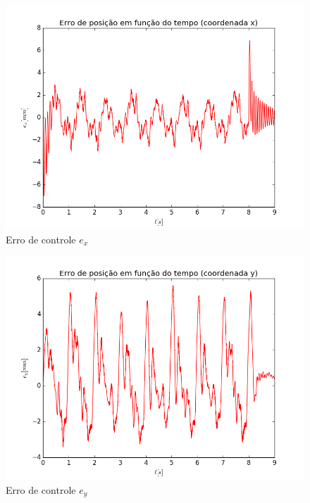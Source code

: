 \documentclass[]{politex}
\begin{document}
\begin{multicols}{2}
\begin{figure}[H]
	\centering
	\includegraphics[scale=0.39]{../../../Experimental/Aquisicoes/PIDSMCt_circulo/ex.png}  
	\caption{Erro de controle $e_x$}
	\label{fig:PIDSMCq_circulo_ex}
\end{figure}
\begin{figure}[H]
	\centering
	\includegraphics[scale=0.39]{../../../Experimental/Aquisicoes/PIDSMCt_circulo/ey.png}  
	\caption{Erro de controle $e_y$}
	\label{fig:PIDSMCq_circulo_ey}
\end{figure}
\end{multicols}
\end{document}
